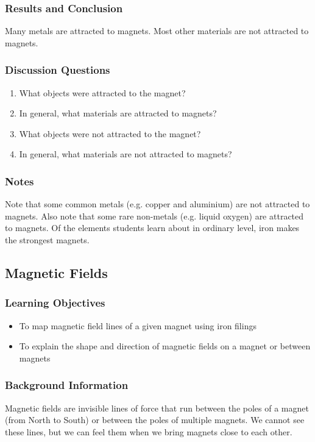 \subsubsection*{Results and Conclusion}
Many metals are attracted to magnets. Most other materials are not attracted to magnets.


\subsubsection*{Discussion Questions}
\begin{enumerate}
\item{What objects were attracted to the magnet?}
\item{In general, what materials are attracted to magnets?}
\item{What objects were not attracted to the magnet?}
\item{In general, what materials are not attracted to magnets?}
\end{enumerate}

\subsubsection*{Notes}
Note that some common metals (e.g. copper and aluminium) are not attracted to magnets. Also note that some rare non-metals (e.g. liquid oxygen) are attracted to magnets. Of the elements students learn about in ordinary level, iron makes the strongest magnets.

\subsection{Magnetic Fields}

\subsubsection*{Learning Objectives}
\begin{itemize}
\item{To map magnetic field lines of a given magnet using iron filings}
\item{To explain the shape and direction of magnetic fields on a magnet or between magnets}
\end{itemize}

\subsubsection*{Background Information}
Magnetic fields are invisible lines of force that run between the poles of a magnet (from North to South) or between the poles of multiple magnets.  We cannot see these lines, but we can feel them when we bring magnets close to each other.

